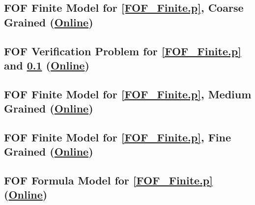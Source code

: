\documentclass{easychair}
\begin{document}
\newpage
\subsection{FOF Finite Model for \ref{FOF_Finite.p}, Coarse Grained
(\href{https://raw.githubusercontent.com/GeoffsPapers/InterpretationFormat/master/Examples/FOF_Finite.s}{Online})}
\label{FOF_Finite.s}
\begin{small}

\end{small}

\newpage
\subsection{FOF Verification Problem for \ref{FOF_Finite.p} and \ref{FOF_Finite.s}
(\href{https://raw.githubusercontent.com/GeoffsPapers/InterpretationFormat/master/Examples/FOF_Finite.s.p}{Online})}
\label{FOF_Finite.s.p}
\begin{small}

\end{small}

\newpage
\subsection{FOF Finite Model for \ref{FOF_Finite.p}, Medium Grained
(\href{https://raw.githubusercontent.com/GeoffsPapers/InterpretationFormat/master/Examples/FOF_Finite_Medium.s}{Online})}
\label{FOF_Finite_Medium.s}
\begin{small}

\end{small}

\newpage
\subsection{FOF Finite Model for \ref{FOF_Finite.p}, Fine Grained
(\href{https://raw.githubusercontent.com/GeoffsPapers/InterpretationFormat/master/Examples/FOF_Finite_Fine.s}{Online})}
\label{FOF_Finite_Fine.s}
\begin{small}

\end{small}

\newpage
\subsection{FOF Formula Model for \ref{FOF_Finite.p}
(\href{https://raw.githubusercontent.com/GeoffsPapers/InterpretationFormat/master/Examples/FOF_Formulae.s}{Online})}
\label{FOF_Formulae.s}
\begin{small}

\end{small}
\end{document}
